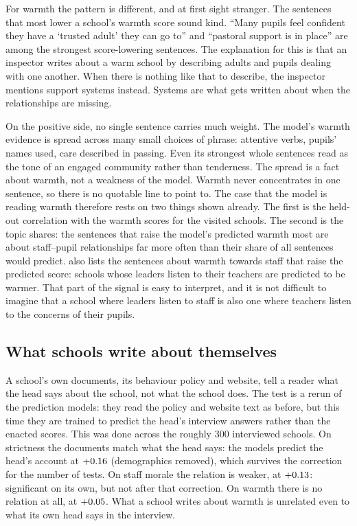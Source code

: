 For warmth the pattern is different, and at first sight stranger. The sentences that most lower
a school's warmth score sound kind. ``Many pupils feel confident they have a `trusted adult' they
can go to'' and ``pastoral support is in place'' are among the strongest score-lowering sentences.
The explanation for this is that an inspector writes about a warm school by describing adults and
pupils dealing with one another. When there is nothing like that to describe, the inspector
mentions support systems instead. Systems are what gets written about when the relationships
are missing.

On the positive side, no single sentence carries much weight. The model's warmth evidence is
spread across many small choices of phrase: attentive verbs, pupils' names used, care described
in passing. Even its strongest whole sentences read as the tone of an engaged community rather
than tenderness. The spread is a fact about warmth, not a weakness of the model. Warmth never
concentrates in one sentence, so there is no quotable line to point to. The case that the model
is reading warmth therefore rests on two things shown already. The first is the held-out
correlation with the warmth scores for the visited schools. The second is the topic shares:
the sentences that raise the model's predicted warmth most are
about staff--pupil relationships far more often than their share of all sentences would
predict.  also lists the sentences about warmth towards staff that raise the predicted score: schools whose leaders listen to their teachers are predicted to be warmer. That
part of the signal is easy to interpret, and it is not difficult to imagine that a school
where leaders listen to staff is also one where teachers listen to the concerns of their pupils.



\subsection{What schools write about themselves}

A school's own documents, its behaviour policy and website, tell a reader what the head says about the school, not what the school does. The test is a rerun of the prediction models: they read the policy and website text as before, but this time they are trained to predict the head's interview answers rather than the enacted scores. This was done across the roughly 300 interviewed schools. On strictness the documents match what the head says: the models predict the head's account at $+0.16$ (demographics removed), which survives the correction for the number of tests. On staff morale the relation is weaker, at $+0.13$: significant on its own, but not after that correction. On warmth there is no relation at all, at $+0.05$. What a school writes about warmth is unrelated even to what its own head says in the interview.

